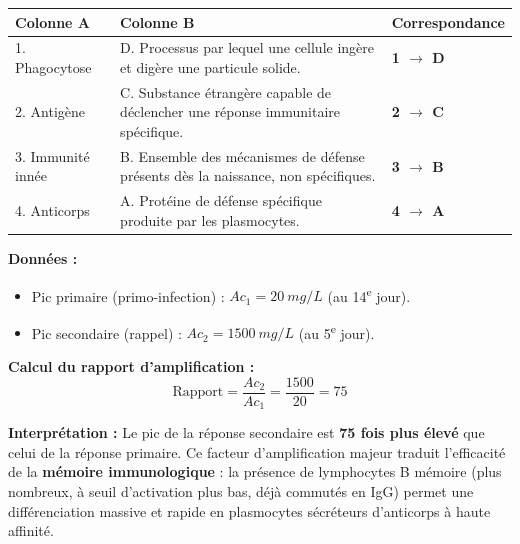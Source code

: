 \documentclass[11pt]{article}
\begin{document}
\begin{corrige}
\begin{center}
\begin{tabularx}{\linewidth}{|l|X|l|}\hline
\textbf{Colonne A} & \textbf{Colonne B} & \textbf{Correspondance} \\ \hline
1. Phagocytose & D. Processus par lequel une cellule ingère et digère une particule solide. & \textbf{1 $\rightarrow$ D} \\ \hline
2. Antigène & C. Substance étrangère capable de déclencher une réponse immunitaire spécifique. & \textbf{2 $\rightarrow$ C} \\ \hline
3. Immunité innée & B. Ensemble des mécanismes de défense présents dès la naissance, non spécifiques. & \textbf{3 $\rightarrow$ B} \\ \hline
4. Anticorps & A. Protéine de défense spécifique produite par les plasmocytes. & \textbf{4 $\rightarrow$ A} \\ \hline
\end{tabularx}
\end{center}
\end{corrige}

\begin{corrige}
\textbf{Données :}
\begin{itemize}
    \item Pic primaire (primo-infection) : $Ac_1 = \SI{20}{mg/L}$ (au 14\textsuperscript{e} jour).
    \item Pic secondaire (rappel) : $Ac_2 = \SI{1500}{mg/L}$ (au 5\textsuperscript{e} jour).
\end{itemize}

\textbf{Calcul du rapport d'amplification :}
\[
\text{Rapport} = \frac{Ac_2}{Ac_1} = \frac{1500}{20} = 75
\]

\textbf{Interprétation :} Le pic de la réponse secondaire est \textbf{75 fois plus élevé} que celui de la réponse primaire. Ce facteur d'amplification majeur traduit l'efficacité de la \textbf{mémoire immunologique} : la présence de lymphocytes B mémoire (plus nombreux, à seuil d'activation plus bas, déjà commutés en IgG) permet une différenciation massive et rapide en plasmocytes sécréteurs d'anticorps à haute affinité.
\end{corrige}
\end{document}
